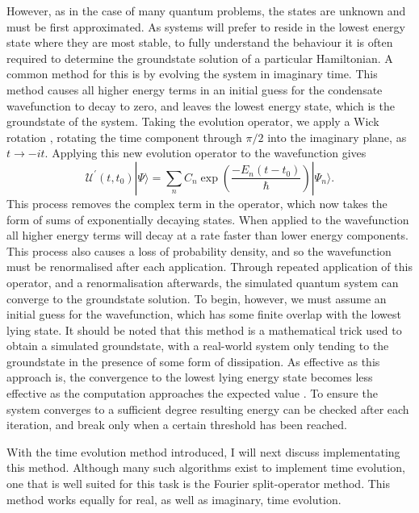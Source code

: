 However, as in the case of many quantum problems, the states are unknown and must be first approximated. As systems will prefer to reside in the lowest energy state where they are most stable, to fully understand the behaviour it is often required to determine the groundstate solution of a particular Hamiltonian. A common method for this is by evolving the system in imaginary time. This method causes all higher energy terms in an initial guess for the condensate wavefunction to decay to zero, and leaves the lowest energy state, which is the groundstate of the system. Taking the evolution operator, we apply a Wick rotation \cite{J. Chem. Phys. 139, 124117 (2013)}, rotating the time component through $\pi/2$ into the imaginary plane, as $t \rightarrow -it$. Applying this new evolution operator to the wavefunction gives
\begin{equation}
       \mathscr{U^{'}}(t,t_0)|\Psi \rangle = \displaystyle\sum\limits_{n} C_n \exp\left(\frac{-{E_n}(t-t_0)}{\hbar}\right)|\Psi_n \rangle.
\end{equation}
This process removes the complex term in the operator, which now takes the form of sums of exponentially decaying states. When applied to the wavefunction all higher energy terms will decay at a rate faster than lower energy components. This process also causes a loss of probability density, and so the wavefunction must be renormalised after each application. Through repeated application of this operator, and a renormalisation afterwards, the simulated quantum system can converge to the groundstate solution. To begin, however, we must assume an initial guess for the wavefunction, which has some finite overlap with the lowest lying state. It should be noted that this method is a mathematical trick used to obtain a simulated groundstate, with a real-world system only tending to the groundstate in the presence of some form of dissipation. As effective as this approach is, the convergence to the lowest lying energy state becomes less effective as the computation approaches the expected value \cite{Vtx:Danaila_pra_2005}. To ensure the system converges to a sufficient degree resulting energy can be checked after each iteration, and break only when a certain threshold has been reached.

With the time evolution method introduced, I will next discuss implementating this method. Although many such algorithms exist to implement time evolution, one that is well suited for this task is the Fourier split-operator method. This method works equally for real, as well as imaginary, time evolution.

